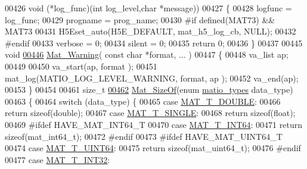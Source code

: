 \begin{DoxyCode}
{{{{{{{{{{{{{{{00426     \textcolor{keywordtype}{void} (*log\_func)(\textcolor{keywordtype}{int} log\_level,\textcolor{keywordtype}{char} *message))
00427 \{
00428     logfunc = log\_func;
00429     progname = prog\_name;
00430 \textcolor{preprocessor}{#if defined(MAT73) && MAT73}
00431     H5Eset\_auto(H5E\_DEFAULT, mat\_h5\_log\_cb, NULL);
00432 \textcolor{preprocessor}{#endif}
00433     verbose = 0;
00434     silent  = 0;
00435     \textcolor{keywordflow}{return} 0;
00436 \}
00437 
00445 \textcolor{keywordtype}{void}
\hyperlink{group__mat__util_gafcedc83eb7e4759a8ea5c974c4f801c3}{00446} \hyperlink{group__mat__util_gafcedc83eb7e4759a8ea5c974c4f801c3}{Mat\_Warning}( \textcolor{keyword}{const} \textcolor{keywordtype}{char} *format, ... )
00447 \{
00448     va\_list ap;
00449 
00450     va\_start(ap, format );
00451     mat\_log(MATIO\_LOG\_LEVEL\_WARNING, format, ap );
00452     va\_end(ap);
00453 \}
00454 
00461 \textcolor{keywordtype}{size\_t}
\hyperlink{group__mat__util_gab6774aabdc124c540c1e7686d0804940}{00462} \hyperlink{group__mat__util_gab6774aabdc124c540c1e7686d0804940}{Mat\_SizeOf}(\textcolor{keyword}{enum} \hyperlink{group___m_a_t_gacf7b3b879282b7ab3a51190e49bf3453}{matio\_types} data\_type)
00463 \{
00464     \textcolor{keywordflow}{switch} (data\_type) \{
00465         \textcolor{keywordflow}{case} \hyperlink{group___m_a_t_ggacf7b3b879282b7ab3a51190e49bf3453a31e721ecf7e188196f83c32838288797}{MAT\_T\_DOUBLE}:
00466             \textcolor{keywordflow}{return} \textcolor{keyword}{sizeof}(double);
00467         \textcolor{keywordflow}{case} \hyperlink{group___m_a_t_ggacf7b3b879282b7ab3a51190e49bf3453a3a3657d40e9212c923d9b9d03531b64c}{MAT\_T\_SINGLE}:
00468             \textcolor{keywordflow}{return} \textcolor{keyword}{sizeof}(float);
00469 \textcolor{preprocessor}{#ifdef HAVE\_MAT\_INT64\_T}
00470         \textcolor{keywordflow}{case} \hyperlink{group___m_a_t_ggacf7b3b879282b7ab3a51190e49bf3453a9e825b5d18b8f946eaf2b4b57e51c145}{MAT\_T\_INT64}:
00471             \textcolor{keywordflow}{return} \textcolor{keyword}{sizeof}(mat\_int64\_t);
00472 \textcolor{preprocessor}{#endif}
00473 \textcolor{preprocessor}{#ifdef HAVE\_MAT\_UINT64\_T}
00474         \textcolor{keywordflow}{case} \hyperlink{group___m_a_t_ggacf7b3b879282b7ab3a51190e49bf3453a45547932c46be27118abe08302d7e29f}{MAT\_T\_UINT64}:
00475             \textcolor{keywordflow}{return} \textcolor{keyword}{sizeof}(mat\_uint64\_t);
00476 \textcolor{preprocessor}{#endif}
00477         \textcolor{keywordflow}{case} \hyperlink{group___m_a_t_ggacf7b3b879282b7ab3a51190e49bf3453a83e06a68320726c6572bfbb9f3addb1d}{MAT\_T\_INT32}:
}}}}}}}}}}}}}}}
\end{DoxyCode}

